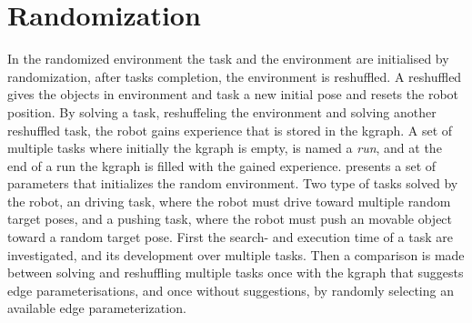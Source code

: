 %
%
%
%
%

\section{Randomization}%
\label{sec:randomization}
In the randomized environment the task and the environment are initialised by randomization, after tasks completion, the environment is reshuffled. A reshuffled gives the objects in environment and task a new initial pose and resets the robot position. By solving a task, reshuffeling the environment and solving another reshuffled task, the robot gains experience that is stored in the \ac{kgraph}. A set of multiple tasks where initially the \ac{kgraph} is empty, is named a \textit{run}, and at the end of a run the \ac{kgraph} is filled with the gained experience.  presents a set of parameters that initializes the random environment. Two type of tasks solved by the robot, an driving task, where the robot must drive toward multiple random target poses, and a pushing task, where the robot must push an movable object toward a random target pose. First the search- and execution time of a task are investigated, and its development over multiple tasks. Then a comparison is made between solving and reshuffling multiple tasks once with the \ac{kgraph} that suggests edge parameterisations, and once without suggestions, by randomly selecting an available edge parameterization.\bs


